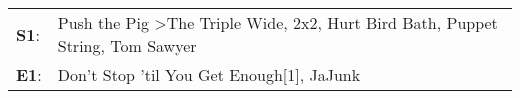\begin{supertabular}{p{0.03\textwidth}p{0.92\textwidth}}
 \textbf{S1}:  &  Push the Pig\textsuperscript{} \textgreater \enspace The Triple Wide\textsuperscript{}, \enspace 2x2\textsuperscript{}, \enspace Hurt Bird Bath\textsuperscript{}, \enspace Puppet String\textsuperscript{}, \enspace Tom Sawyer\textsuperscript{}  \enspace  \\
 \textbf{E1}:  &                                                                                                                                                              Don't Stop 'til You Get Enough[1]\textsuperscript{}, \enspace JaJunk\textsuperscript{}  \enspace  \\
\end{supertabular}

